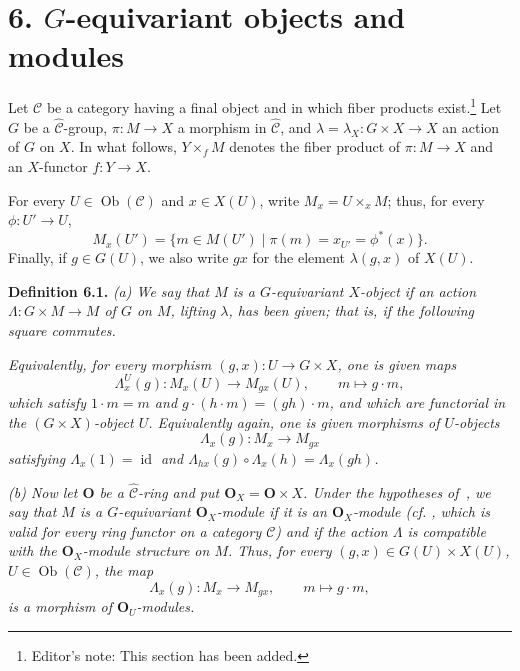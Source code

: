 
\section*{6. \(G\)-equivariant objects and modules}

Let \(\mathscr C\) be a category having a final object and in which fiber
products exist.\footnote{Editor's note: This section has been added.}
Let \(G\) be a \(\widehat{\mathscr C}\)-group,
\(\pi:M\to X\) a morphism in \(\widehat{\mathscr C}\), and
\(\lambda=\lambda_X:G\times X\to X\) an action of \(G\) on \(X\).
In what follows, \(Y\times_f M\) denotes the fiber product of
\(\pi:M\to X\) and an \(X\)-functor \(f:Y\to X\).

For every \(U\in\operatorname{Ob}(\mathscr C)\) and \(x\in X(U)\), write
\(M_x=U\times_x M\); thus, for every \(\phi:U'\to U\),
\[
  M_x(U')
  =\{m\in M(U')\mid \pi(m)=x_{U'}=\phi^*(x)\}.
\]
Finally, if \(g\in G(U)\), we also write \(gx\) for the element
\(\lambda(g,x)\) of \(X(U)\).

\medskip
\noindent{}\textbf{Definition 6.1.}
\textit{(a) We say that \(M\) is a \(G\)-equivariant \(X\)-object if an
action \(\Lambda:G\times M\to M\) of \(G\) on \(M\), lifting
\(\lambda\), has been given; that is, if the following square commutes.}

\begin{figure}[H]
  \centering
  
  \label{fig:sga3-exp1-p039-equivariant-action-square}
\end{figure}

\textit{Equivalently, for every morphism
\((g,x):U\to G\times X\), one is given maps}
\[
  \Lambda_x^U(g):M_x(U)\longrightarrow M_{gx}(U),
  \qquad m\longmapsto g\cdot m,
\]
\textit{which satisfy \(1\cdot m=m\) and
\(g\cdot(h\cdot m)=(gh)\cdot m\), and which are functorial in the
\((G\times X)\)-object \(U\). Equivalently again, one is given morphisms
of \(U\)-objects}
\[
  \Lambda_x(g):M_x\longrightarrow M_{gx}
\]
\textit{satisfying
\(\Lambda_x(1)=\operatorname{id}\) and
\(\Lambda_{hx}(g)\circ\Lambda_x(h)=\Lambda_x(gh)\).}

\textit{(b) Now let \(\mathbf O\) be a
\(\widehat{\mathscr C}\)-ring and put
\(\mathbf O_X=\mathbf O\times X\). Under the hypotheses of~, we say
that \(M\) is a \(G\)-equivariant \(\mathbf O_X\)-module if it is an
\(\mathbf O_X\)-module (cf. , which is valid for every
ring functor on a category \(\mathscr C\)) and if the action \(\Lambda\)
is compatible with the \(\mathbf O_X\)-module structure on \(M\). Thus,
for every \((g,x)\in G(U)\times X(U)\),
\(U\in\operatorname{Ob}(\mathscr C)\), the map}
\[
  \Lambda_x(g):M_x\longrightarrow M_{gx},
  \qquad m\longmapsto g\cdot m,
\]
\textit{is a morphism of \(\mathbf O_U\)-modules.}

